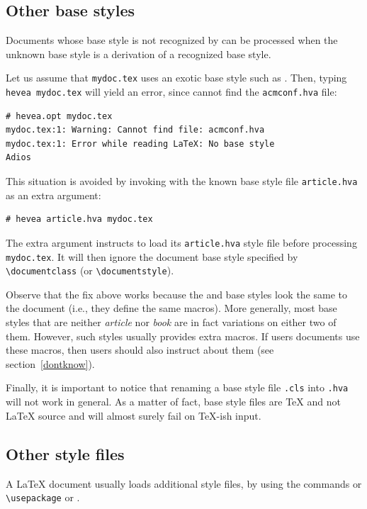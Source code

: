 \subsection{Other base styles}\label{otherbase}
Documents whose base style is not recognized by \hevea{} can be
processed when the unknown base style is a derivation of a
recognized base style.

Let us assume that \texttt{mydoc.tex} uses an exotic
base style such as . Then, typing
\verb+hevea mydoc.tex+ will yield an error, since
\hevea{} cannot find the \texttt{acmconf.hva} file:
\begin{verbatim}
# hevea.opt mydoc.tex
mydoc.tex:1: Warning: Cannot find file: acmconf.hva
mydoc.tex:1: Error while reading LaTeX: No base style
Adios
\end{verbatim}


This situation is avoided by invoking \hevea{} with the known
base style file  \texttt{article.hva} as an extra argument:
\begin{verbatim}
# hevea article.hva mydoc.tex
\end{verbatim}
The extra argument instructs
\hevea{} to load its \texttt{article.hva}
style file before processing \texttt{mydoc.tex}.
It will then ignore the document base style specified by
\verb+\documentclass+ (or \verb+\documentstyle+).

Observe that the fix above works because the  and
 base styles look the same to the document (i.e., they define
the same macros).
More generally, most  base styles that are neither
\textit{article} nor \textit{book} are in fact variations
on either two of them.
However, such styles usually provides extra macros.
If users documents use these macros, then users should also instruct
\hevea{} about them (see section~\ref{dontknow}).


Finally, it is important to notice that
renaming a base style file \verb+.cls+ into
\verb+.hva+ will not work in general.
As a matter of fact, base style files are \TeX{} and not \LaTeX{} source and
\hevea{} will almost surely fail on \TeX-ish input.


\subsection{Other style files}
A \LaTeX{} document usually loads additional style files, by using
the commands  \verb++ or \verb+\usepackage+ or \verb++.


